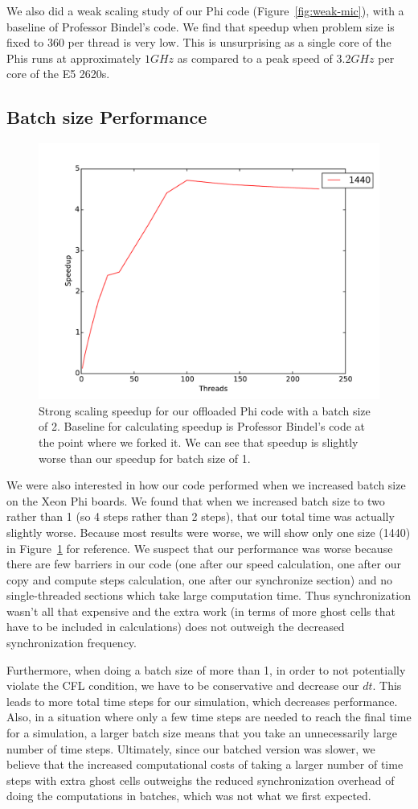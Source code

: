 We also did a weak scaling study of our Phi code (Figure~\ref{fig:weak-mic}), with a baseline of Professor Bindel's code. We find that speedup when problem size is fixed to 360 per thread is very low. This is unsurprising as a single core of the Phis runs at approximately $1GHz$ as compared to a peak speed of $3.2GHz$ per core of the E5 2620s.

\subsection{Batch size Performance}

\begin{figure}[h!]
\centering
\includegraphics[width=0.5\linewidth]{mic_strong_bindel_baseline_batchsize2.pdf}
\caption{Strong scaling speedup for our offloaded Phi code with a batch size of 2. Baseline for calculating speedup is Professor Bindel's code at the point where we forked it. We can see that speedup is slightly worse than our speedup for batch size of 1.}
\label{fig:batch2}
\end{figure}

We were also interested in how our code performed when we increased batch size on the Xeon Phi boards. We found that when we increased batch size to two rather than 1 (so 4 steps rather than 2 steps), that our total time was actually slightly worse. Because most results were worse, we will show only one size (1440) in Figure~\ref{fig:batch2} for reference. We suspect that our performance was worse because there are few barriers in our code (one after our speed calculation, one after our copy and compute steps calculation, one after our synchronize section) and no single-threaded sections which take large computation time. Thus synchronization wasn't all that expensive and the extra work (in terms of more ghost cells that have to be included in calculations) does not outweigh the decreased synchronization frequency.

Furthermore, when doing a batch size of more than 1, in order to not potentially violate the CFL condition, we have to be conservative and decrease our $dt$. This leads to more total time steps for our simulation, which decreases performance. Also, in a situation where only a few time steps are needed to reach the final time for a simulation, a larger batch size means that you take an unnecessarily large number of time steps. Ultimately, since our batched version was slower, we believe that the increased computational costs of taking a larger number of time steps with extra ghost cells outweighs the reduced synchronization overhead of doing the computations in batches, which was not what we first expected.
